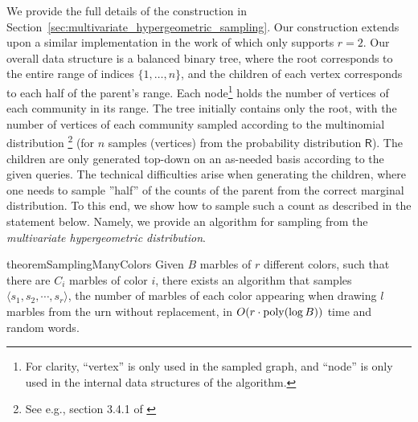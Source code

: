 We provide the full details of the construction in Section~\ref{sec:multivariate_hypergeometric_sampling}.
Our construction extends upon a similar implementation in the work of \cite{huge} which only supports $r = 2$.
Our overall data structure is a balanced binary tree, where the root corresponds to the entire range of indices $\{1, \ldots, n\}$,
and the children of each vertex corresponds to each half of the parent's range.
Each node\footnote{For clarity, ``vertex'' is only used in the sampled graph,
and ``node'' is only used in the internal data structures of the algorithm.}
holds the number of vertices of each community in its range.
The tree initially contains only the root, with the number of vertices of each community sampled according to the multinomial distribution
\footnote{See e.g., section 3.4.1 of \cite{knuth}} (for $n$ samples (vertices) from the probability distribution $\mathsf{R}$).
The children are only generated top-down on an as-needed basis according to the given queries.
The technical difficulties arise when generating the children,
where one needs to sample ''half'' of the counts of the parent from the correct marginal distribution.
To this end, we show how to sample such a count as described in the statement below.
Namely, we provide an algorithm for sampling from the \emph{multivariate hypergeometric distribution}.

\begin{restatable}{theorem}{SamplingManyColors}
\label{thm:SamplingManyColors}
Given $B$ marbles of $r$ different colors, such that there are $C_i$ marbles of color $i$,
there exists an algorithm that samples $\langle s_1, s_2,\cdots, s_r \rangle$,
the number of marbles of each color appearing when drawing $l$ marbles from the urn without replacement,
in $O(r\cdot\mathrm{poly}(\log B))$ time and random words.
\end{restatable}

